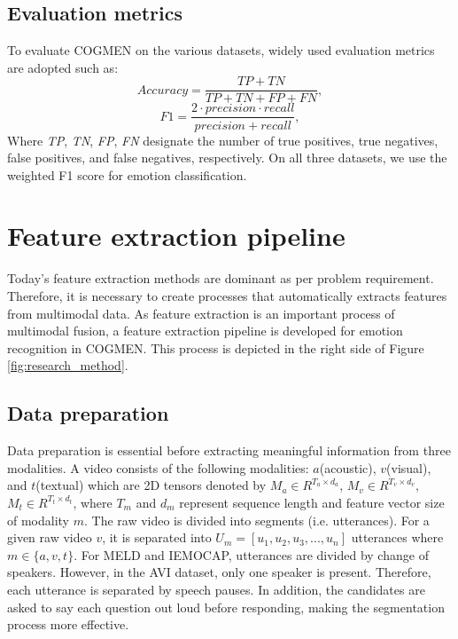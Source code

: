\subsection{Evaluation metrics}
To evaluate COGMEN on the various datasets, widely used evaluation metrics are adopted such as:
%
\begin{equation*}
    Accuracy = \frac{TP+TN}{TP+TN+FP+FN},\tag{14}
\end{equation*}
%
\begin{equation*}
    F1 = \frac{2 \cdot precision \cdot recall}{precision + recall},\tag{15}
\end{equation*}
%
Where \textit{TP}, \textit{TN}, \textit{FP}, \textit{FN} designate the number of true positives, true negatives, false positives, and false negatives, respectively. On all three datasets, we use the weighted F1 score for emotion classification. 

\section{Feature extraction pipeline}
\label{sec:feature_extraction}
Today's feature extraction methods are dominant as per problem requirement. Therefore, it is necessary to create processes that automatically extracts features from multimodal data. As feature extraction is an important process of multimodal fusion, a feature extraction pipeline is developed for emotion recognition in COGMEN. This process is depicted in the right side of Figure \ref{fig:research_method}. 

\subsection{Data preparation}
Data preparation is essential before extracting meaningful information from three modalities. A video consists of the following modalities: $a$(acoustic), $v$(visual), and $t$(textual) which are 2D tensors denoted by $M_{a} \in R^{T_{a} \times d_{a}}$, $M_{v} \in R^{T_{v} \times d_{v}}$, $M_{t} \in R^{T_{t} \times d_{t}}$, where $T_{m}$ and $d_{m}$ represent sequence length and feature vector size of modality $m$. The raw video is divided into segments (i.e. utterances). For a given raw video $v$, it is separated into $U_{m} = [u_{1}, u_{2}, u_{3}, ..., u_{n}]$ utterances where $m\in\{a, v, t\}$. For MELD and IEMOCAP, utterances are divided by change of speakers. However, in the AVI dataset, only one speaker is present. Therefore, each utterance is separated by speech pauses. In addition, the candidates are asked to say each question out loud before responding, making the segmentation process more effective. 

